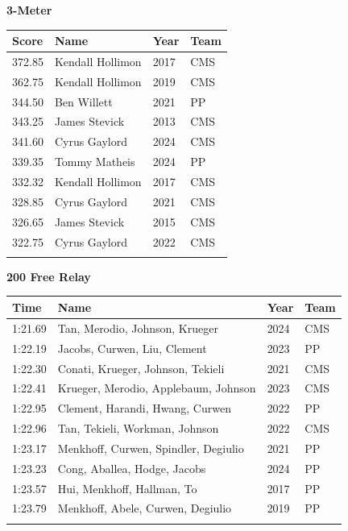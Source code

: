 \vspace{1.2em}
\noindent\begin{minipage}[t]{0.98\textwidth}
\centering
\textbf{\textcolor{teamprimary}{3-Meter}}\par
\vspace{0.5em}
\centering
\small
\renewcommand{\arraystretch}{1.0}
\setlength{\tabcolsep}{4pt}
\begin{tabular}{@{}p{2.5cm}p{4.5cm}p{1.5cm}p{2.5cm}@{}}
\toprule
\textbf{Score} & \textbf{Name} & \textbf{Year} & \textbf{Team} \\
\midrule
372.85 & Kendall Hollimon & 2017 & CMS \\
362.75 & Kendall Hollimon & 2019 & CMS \\
344.50 & Ben Willett & 2021 & PP \\
343.25 & James Stevick & 2013 & CMS \\
341.60 & Cyrus Gaylord & 2024 & CMS \\
339.35 & Tommy Matheis & 2024 & PP \\
332.32 & Kendall Hollimon & 2017 & CMS \\
328.85 & Cyrus Gaylord & 2021 & CMS \\
326.65 & James Stevick & 2015 & CMS \\
322.75 & Cyrus Gaylord & 2022 & CMS \\
\bottomrule
\vspace{0.5em}
\end{tabular}
\end{minipage}
\vspace{1.2em}
\noindent\begin{minipage}[t]{0.98\textwidth}
\centering
\textbf{\textcolor{teamprimary}{200 Free Relay}}\par
\vspace{0.5em}
\centering
\small
\renewcommand{\arraystretch}{1.0}
\setlength{\tabcolsep}{4pt}
\begin{tabular}{@{}p{2.7cm}p{4.3cm}p{1.6cm}p{2.7cm}@{}}
\toprule
\textbf{Time} & \textbf{Name} & \textbf{Year} & \textbf{Team} \\
\midrule
1:21.69 & Tan, Merodio, Johnson, Krueger & 2024 & CMS \\
1:22.19 & Jacobs, Curwen, Liu, Clement & 2023 & PP \\
1:22.30 & Conati, Krueger, Johnson, Tekieli & 2021 & CMS \\
1:22.41 & Krueger, Merodio, Applebaum, Johnson & 2023 & CMS \\
1:22.95 & Clement, Harandi, Hwang, Curwen & 2022 & PP \\
1:22.96 & Tan, Tekieli, Workman, Johnson & 2022 & CMS \\
1:23.17 & Menkhoff, Curwen, Spindler, Degiulio & 2021 & PP \\
1:23.23 & Cong, Aballea, Hodge, Jacobs & 2024 & PP \\
1:23.57 & Hui, Menkhoff, Hallman, To & 2017 & PP \\
1:23.79 & Menkhoff, Abele, Curwen, Degiulio & 2019 & PP \\
\bottomrule
\vspace{0.5em}
\end{tabular}
\end{minipage}
